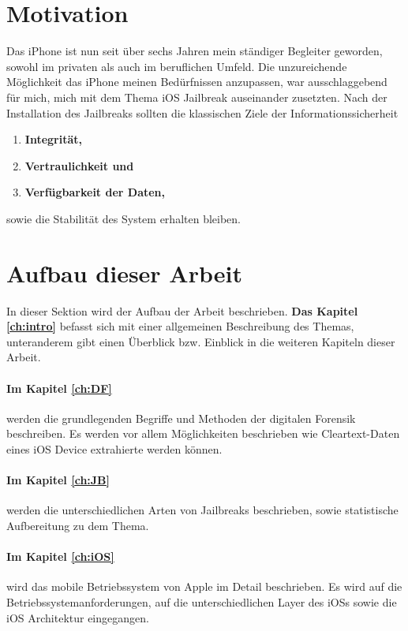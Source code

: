 \section{Motivation }
\label{sec:IntroMotivation}
Das iPhone ist nun seit über sechs Jahren mein ständiger Begleiter geworden, sowohl im privaten als auch im beruflichen Umfeld. Die unzureichende Möglichkeit das iPhone meinen Bedürfnissen anzupassen, war ausschlaggebend für mich, mich mit dem Thema iOS Jailbreak auseinander zusetzten. 
Nach der Installation des Jailbreaks sollten die klassischen Ziele der Informationssicherheit 
\begin{enumerate}
    \item \textbf{Integrität,}
    \item \textbf{Vertraulichkeit und} 
    \item \textbf{Verfügbarkeit der Daten,}
\end{enumerate}
sowie die Stabilität des System erhalten bleiben.


\section{Aufbau dieser Arbeit}
\label{sec:IntroAufbau}
In dieser Sektion wird der Aufbau der Arbeit beschrieben. \textbf{Das Kapitel \ref{ch:intro}} befasst sich mit einer allgemeinen Beschreibung des Themas, unteranderem gibt einen Überblick bzw. Einblick in die weiteren Kapiteln dieser Arbeit.

\paragraph{Im Kapitel \ref{ch:DF}} werden die grundlegenden Begriffe und Methoden der digitalen Forensik beschreiben. Es werden vor allem Möglichkeiten beschrieben wie Cleartext-Daten eines iOS Device extrahierte werden können.

\paragraph{Im Kapitel \ref{ch:JB}} werden die unterschiedlichen Arten von Jailbreaks beschrieben, sowie statistische Aufbereitung zu dem Thema.

\paragraph{Im Kapitel \ref{ch:iOS}} wird das mobile Betriebssystem von Apple im Detail beschrieben. Es wird auf die Betriebssystemanforderungen, auf die unterschiedlichen Layer des iOSs sowie die iOS Architektur eingegangen. 

